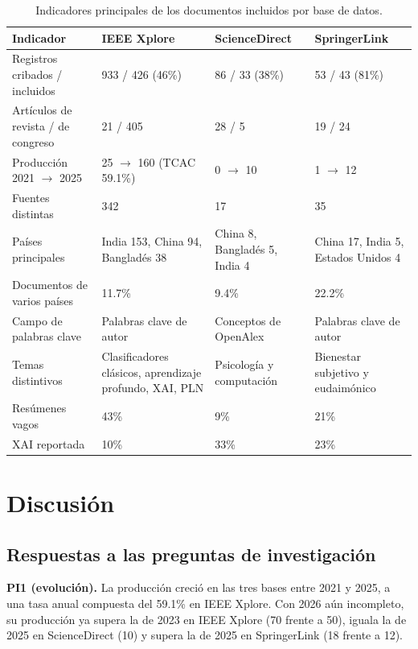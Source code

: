 \documentclass[11pt,a4paper]{article}
\begin{document}
\begin{table}[htbp]
\centering
\caption{Indicadores principales de los documentos incluidos por base de datos.}
\label{tab:comparison}
\small
\begin{tabularx}{\textwidth}{lYYY}
\toprule
Indicador & IEEE Xplore & ScienceDirect & SpringerLink \\
\midrule
Registros cribados / incluidos & 933 / 426 (46\%) & 86 / 33 (38\%) & 53 / 43 (81\%) \\
Artículos de revista / de congreso & 21 / 405 & 28 / 5 & 19 / 24 \\
Producción 2021 $\rightarrow$ 2025 & 25 $\rightarrow$ 160 (TCAC 59.1\%) & 0 $\rightarrow$ 10 & 1 $\rightarrow$ 12 \\
Fuentes distintas & 342 & 17 & 35 \\
Países principales & India 153, China 94, Bangladés 38 & China 8, Bangladés 5, India 4 & China 17, India 5, Estados Unidos 4 \\
Documentos de varios países & 11.7\% & 9.4\% & 22.2\% \\
Campo de palabras clave & Palabras clave de autor & Conceptos de OpenAlex & Palabras clave de autor \\
Temas distintivos & Clasificadores clásicos, aprendizaje profundo, XAI, PLN & Psicología y computación & Bienestar subjetivo y eudaimónico \\
Resúmenes vagos & 43\% & 9\% & 21\% \\
XAI reportada & 10\% & 33\% & 23\% \\
\bottomrule
\end{tabularx}
\end{table}

\section{Discusión}\label{sec:discussion}

\subsection{Respuestas a las preguntas de investigación}

\textbf{PI1 (evolución).} La producción creció en las tres bases entre 2021 y 2025, a una tasa anual compuesta del 59.1\% en IEEE Xplore. Con 2026 aún incompleto, su producción ya supera la de 2023 en IEEE Xplore (70 frente a 50), iguala la de 2025 en ScienceDirect (10) y supera la de 2025 en SpringerLink (18 frente a 12).
\end{document}
